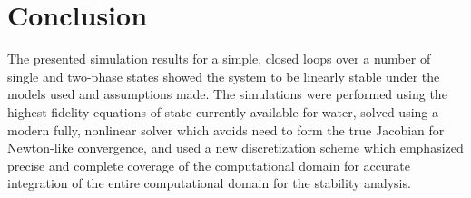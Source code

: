 \documentclass{UWMadThesis}
\begin{document}
\MakeTitlePage{}
\begin{LicensePage}
    \CreativeCommons
    \Attribution
    \NonCommercial
    \ShareAlike
\end{LicensePage}





\TableOfContents
\ListOfTables
\ListOfFigures

\begin{Acronym}
\end{Acronym}







\chapter{Conclusion}
The presented simulation results for a simple, closed loops over a number of single and two-phase states showed the system to be linearly stable under the models used and assumptions made.
The simulations were performed using the highest fidelity equations-of-state currently available for water, solved using a modern fully, nonlinear solver which avoids need to form the true Jacobian for Newton-like convergence, and used a new  discretization scheme which emphasized precise and complete coverage of the computational domain for accurate integration of the entire computational domain for the stability analysis.
\end{document}

